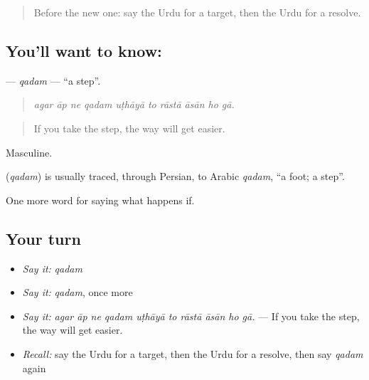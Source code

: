 \label{lesson:UR-C378-qadam}



\begin{quote}
Before the new one: say the Urdu for a target, then the Urdu for a resolve.
\end{quote}

\subsection*{You'll want to know: }
\textbf{} — \emph{qadam} — \textquotedblleft{}a step\textquotedblright{}.

\begin{quote}
         
\end{quote}

\begin{quote}
\emph{agar āp ne qadam uṭhāyā to rāstā āsān ho gā.}
\end{quote}

\begin{quote}
If you take the step, the way will get easier.
\end{quote}

Masculine.

\begin{cousinweb}
\textbf{} (\emph{qadam}) is usually traced, through Persian, to Arabic \emph{qadam}, \textquotedblleft{}a foot; a step\textquotedblright{}.
\end{cousinweb}

\begin{grammarlens}[title={What you've built}]
One more word for saying what happens if.
\end{grammarlens}

\subsection*{Your turn}
\begin{itemize}
\raggedright
  \item \emph{Say it:} \emph{qadam}
  \item \emph{Say it:} \emph{qadam}, once more
  \item \emph{Say it:} \emph{agar āp ne qadam uṭhāyā to rāstā āsān ho gā.} — If you take the step, the way will get easier.
  \item \emph{Recall:} say the Urdu for a target, then the Urdu for a resolve, then say \emph{qadam} again
\end{itemize}

